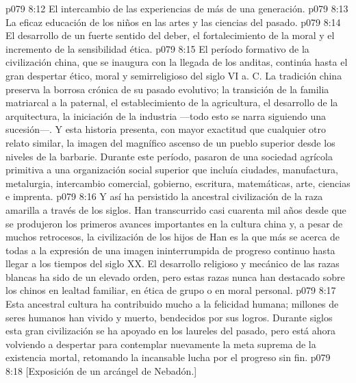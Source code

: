\vs p079 8:12 El intercambio de las experiencias de más de una generación.
\vs p079 8:13 La eficaz educación de los niños en las artes y las ciencias del pasado.
\vs p079 8:14 El desarrollo de un fuerte sentido del deber, el fortalecimiento de la moral y el incremento de la sensibilidad ética.
\vs p079 8:15 \pc El período formativo de la civilización china, que se inaugura con la llegada de los anditas, continúa hasta el gran despertar ético, moral y semirreligioso del siglo VI a. C. La tradición china preserva la borrosa crónica de su pasado evolutivo; la transición de la familia matriarcal a la paternal, el establecimiento de la agricultura, el desarrollo de la arquitectura, la iniciación de la industria ---todo esto se narra siguiendo una sucesión---. Y esta historia presenta, con mayor exactitud que cualquier otro relato similar, la imagen del magnífico ascenso de un pueblo superior desde los niveles de la barbarie. Durante este período, pasaron de una sociedad agrícola primitiva a una organización social superior que incluía ciudades, manufactura, metalurgia, intercambio comercial, gobierno, escritura, matemáticas, arte, ciencias e imprenta.
\vs p079 8:16 Y así ha persistido la ancestral civilización de la raza amarilla a través de los siglos. Han transcurrido casi cuarenta mil años desde que se produjeron los primeros avances importantes en la cultura china y, a pesar de muchos retrocesos, la civilización de los hijos de Han es la que más se acerca de todas a la expresión de una imagen ininterrumpida de progreso continuo hasta llegar a los tiempos del siglo XX. El desarrollo religioso y mecánico de las razas blancas ha sido de un elevado orden, pero estas razas nunca han destacado sobre los chinos en lealtad familiar, en ética de grupo o en moral personal.
\vs p079 8:17 Esta ancestral cultura ha contribuido mucho a la felicidad humana; millones de seres humanos han vivido y muerto, bendecidos por sus logros. Durante siglos esta gran civilización se ha apoyado en los laureles del pasado, pero está ahora volviendo a despertar para contemplar nuevamente la meta suprema de la existencia mortal, retomando la incansable lucha por el progreso sin fin.
\vsetoff
\vs p079 8:18 [Exposición de un arcángel de Nebadón.]

